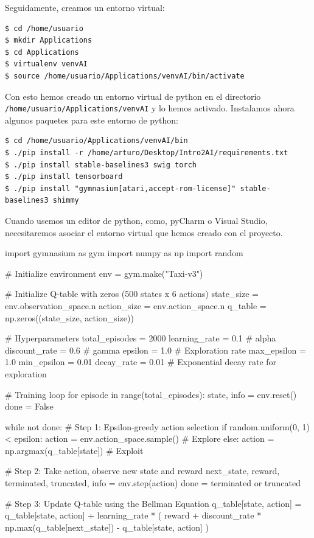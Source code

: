 \documentclass{article}
\begin{document}
\begin{itemize}
Seguidamente, creamos un entorno virtual:
\begin{verbatim}
$ cd /home/usuario
$ mkdir Applications
$ cd Applications
$ virtualenv venvAI
$ source /home/usuario/Applications/venvAI/bin/activate
\end{verbatim}
Con esto hemos creado un entorno virtual de python en el directorio \texttt{/home/usuario/Applications/venvAI} y lo hemos activado. Instalamos ahora algunos paquetes para este entorno de python:
\begin{verbatim}
$ cd /home/usuario/Applications/venvAI/bin
$ ./pip install -r /home/arturo/Desktop/Intro2AI/requirements.txt 
$ ./pip install stable-baselines3 swig torch
$ ./pip install tensorboard
$ ./pip install "gymnasium[atari,accept-rom-license]" stable-baselines3 shimmy
\end{verbatim}

Cuando usemos un editor de python, como, pyCharm o Visual Studio, necesitaremos asociar el entorno virtual que hemos creado con el proyecto.

import gymnasium as gym
import numpy as np
import random

# Initialize environment
env = gym.make("Taxi-v3")

# Initialize Q-table with zeros (500 states x 6 actions)
state_size = env.observation_space.n
action_size = env.action_space.n
q_table = np.zeros((state_size, action_size))

# Hyperparameters
total_episodes = 2000
learning_rate = 0.1      # alpha
discount_rate = 0.6      # gamma
epsilon = 1.0            # Exploration rate
max_epsilon = 1.0
min_epsilon = 0.01
decay_rate = 0.01        # Exponential decay rate for exploration

# Training loop
for episode in range(total_episodes):
    state, info = env.reset()
    done = False
    
    while not done:
        # Step 1: Epsilon-greedy action selection
        if random.uniform(0, 1) < epsilon:
            action = env.action_space.sample() # Explore
        else:
            action = np.argmax(q_table[state]) # Exploit
            
        # Step 2: Take action, observe new state and reward
        next_state, reward, terminated, truncated, info = env.step(action)
        done = terminated or truncated
        
        # Step 3: Update Q-table using the Bellman Equation
        q_table[state, action] = q_table[state, action] + learning_rate * (
            reward + discount_rate * np.max(q_table[next_state]) - q_table[state, action]
        )
        

\end{itemize}
\end{document}
